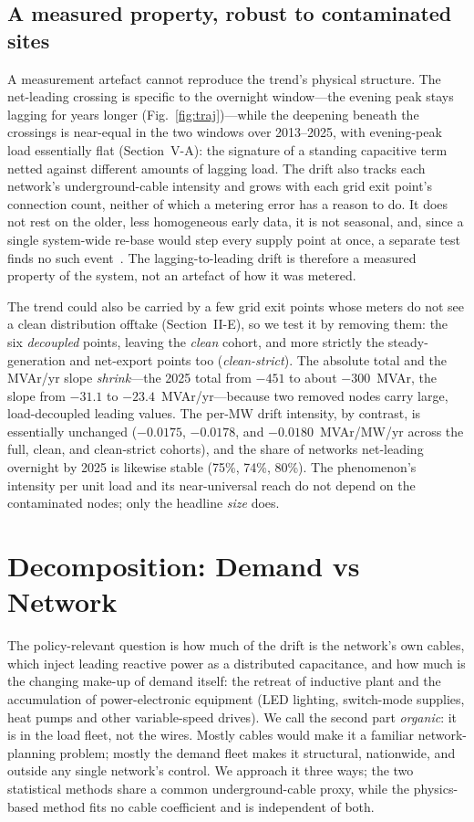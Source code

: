 \documentclass[journal]{IEEEtran}
\begin{document}
\subsection{A measured property, robust to contaminated sites}
A measurement artefact cannot reproduce the trend's physical structure. The
net-leading crossing is specific to the overnight window---the evening peak stays
lagging for years longer (Fig.~\ref{fig:traj})---while the deepening beneath the
crossings is near-equal in the two windows over 2013--2025, with evening-peak
load essentially flat (Section~V-A): the signature of a standing capacitive term
netted against different amounts of lagging load. The drift also tracks each
network's underground-cable intensity and grows with each grid exit point's
connection count, neither of which a metering error has a reason to do. It does
not rest on the older, less homogeneous early data, it is not seasonal, and, since a single system-wide re-base would step every supply point at once, a separate test finds no such event~\cite{hume_extended}. The lagging-to-leading drift is therefore
a measured property of the system, not an artefact of how it was metered.

The trend could also be carried by a few grid exit points whose meters do not see
a clean distribution offtake (Section~II-E), so we test it by removing them:
the six \emph{decoupled} points, leaving the \emph{clean} cohort, and more strictly the
steady-generation and net-export points too (\emph{clean-strict}). The absolute
total and the MVAr/yr slope \emph{shrink}---the 2025 total from $-451$ to about
$-300$~MVAr, the slope from $-31.1$ to $-23.4$~MVAr/yr---because two removed nodes
carry large, load-decoupled leading values. The per-MW drift intensity, by
contrast, is essentially unchanged ($-0.0175$, $-0.0178$, and
$-0.0180$~MVAr/MW/yr across the full, clean, and clean-strict cohorts), and the
share of networks net-leading overnight by 2025 is likewise stable (75\%, 74\%,
80\%). The phenomenon's intensity per unit load and its near-universal reach do
not depend on the contaminated nodes; only the headline \emph{size} does.

\section{Decomposition: Demand vs Network}
The policy-relevant question is how much of the drift is the network's own cables,
which inject leading reactive power as a distributed capacitance, and how much is
the changing make-up of demand itself: the retreat of inductive plant and the
accumulation of power-electronic equipment (LED lighting, switch-mode supplies,
heat pumps and other variable-speed drives). We call the second part
\emph{organic}: it is in the load fleet, not the wires. Mostly cables would make
it a familiar network-planning problem; mostly the demand fleet makes it
structural, nationwide, and outside any single network's control. We approach it three ways; the two statistical methods
share a common underground-cable proxy, while the physics-based method fits no
cable coefficient and is independent of both.
\end{document}
